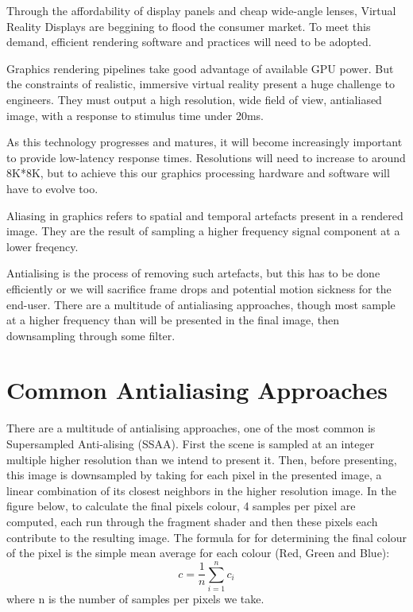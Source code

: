 \documentclass[12pt,a4paper,twoside,openright]{report}
\begin{document}
Through the affordability of display panels and cheap wide-angle lenses, Virtual Reality Displays are beggining to flood the consumer market. To meet this demand, efficient rendering software and practices will need to be adopted.

Graphics rendering pipelines take good advantage of available GPU power. But the constraints of realistic, immersive virtual reality present a huge challenge to engineers. They must output a high resolution, wide field of view, antialiased image, with a response to stimulus time under 20ms.

As this technology progresses and matures, it will become increasingly important to provide low-latency response times. Resolutions will need to increase to around 8K*8K, but to achieve this our graphics processing hardware and software will have to evolve too.

Aliasing in graphics refers to spatial and temporal artefacts present in a rendered image. They are the result of sampling a higher frequency signal component at a lower freqency.

Antialising is the process of removing such artefacts, but this has to be done efficiently or we will sacrifice frame drops and potential motion sickness for the end-user.
There are a multitude of antialiasing approaches, though most sample at a higher frequency than will be presented in the final image, then downsampling through some filter. 


\section{Common Antialiasing Approaches}

There are a multitude of antialising approaches, one of the most common is Supersampled Anti-alising (SSAA).
First the scene is sampled at an integer multiple higher resolution than we intend to present it.
Then, before presenting, this image is downsampled by taking for each pixel in the presented image, a linear combination of its closest neighbors in the higher resolution image. In the figure below, to calculate the final pixels colour, 4 samples per pixel are computed, each run through the fragment shader and then these pixels each contribute to the resulting image. The formula for for determining the final colour of the pixel is the simple mean average for each colour (Red, Green and Blue):
$$ c = \frac{1}{n}\displaystyle\sum_{i=1}^n c_i $$ where n is the number of samples per pixels we take.
\end{document}
